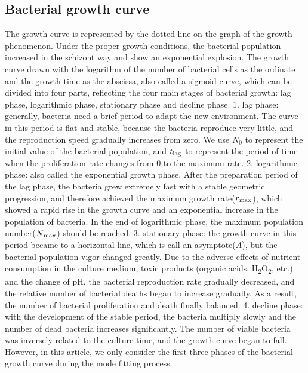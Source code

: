 \documentclass[11pt]{article}
\begin{document}
    \subsection{Bacterial growth curve}
    The growth curve is represented by the dotted line on the graph of the growth phenomenon. Under the proper growth conditions, the bacterial population increased in the schizont way and show an exponential explosion\citep{eagon1962pseudomonas}. The growth curve drawn with the logarithm of the number of bacterial cells as the ordinate and the growth time as the abscissa, also called a sigmoid curve, which can be divided into four parts, reflecting the four main stages of bacterial growth\citep{baty2004estimating}: lag phase, logarithmic phase, stationary phase and decline phase. 1. lag phase: generally, bacteria need a brief period to adapt the new environment. The curve in this period is flat and stable, because the bacteria reproduce very little, and the reproduction speed gradually increases from zero\citep{bertrand2019lag}. We use $N_0$ to represent the initial value of the bacterial population, and $t\textsubscript{lag}$ to represent the period of time when the proliferation rate changes from 0 to the maximum rate. 2. logarithmic phase: also called the exponential growth phase. After the preparation period of the lag phase, the bacteria grew extremely fast with a stable geometric progression, and therefore achieved the maximum growth rate($r\textsubscript{max}$), which showed a rapid rise in the growth curve and an exponential increase in the population of bacteria. In the end of logarithmic phase, the maximum population number($N\textsubscript{max}$) should be reached. 3. stationary phase: the growth curve in this period became to a horizontal line, which is call an asymptote($A$), but the bacterial population vigor changed greatly. Due to the adverse effects of nutrient consumption in the culture medium, toxic products (organic acids, H\textsubscript{2}O\textsubscript{2}, etc.) and the change of pH, the bacterial reproduction rate gradually decreased, and the relative number of bacterial deaths began to increase gradually\citep{bridges2001effect}. As a result, the number of bacterial proliferation and death finally balanced. 4. decline phase: with the development of the stable period, the bacteria multiply slowly and the number of dead bacteria increases significantly. The number of viable bacteria was inversely related to the culture time, and the growth curve began to fall\citep{novick1955growth}. However, in this article, we only consider the first three phases of the bacterial growth curve during the mode fitting process.
    
\end{document}
